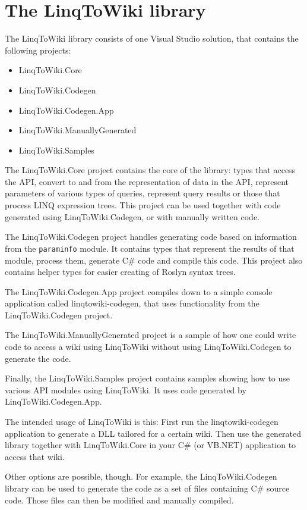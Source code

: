 \chapter{The LinqToWiki library}

The LinqToWiki library consists of one Visual Studio solution, that contains the following projects:

\begin{itemize}
\item LinqToWiki.Core
\item LinqToWiki.Codegen
\item LinqToWiki.Codegen.App
\item LinqToWiki.ManuallyGenerated
\item LinqToWiki.Samples
\end{itemize}

The LinqToWiki.Core project contains the core of the library:
types that access the \ac{API}, convert to and from the representation of data in the \ac{API},
represent parameters of various types of queries, represent query results
or those that process \ac{LINQ} expression trees.
This project can be used together with code generated using LinqToWiki.Codegen,
or with manually written code.

The LinqToWiki.Codegen project handles generating code based on information from the \texttt{paraminfo} module.
It contains types that represent the results of that module, process them, generate C\# code and compile this code.
This project also contains helper types for easier creating of Roslyn syntax trees.

The LinqToWiki.Codegen.App project compiles down to a simple console application called linqtowiki-codegen,
that uses functionality from the LinqToWiki.\allowbreak{}Codegen project.

The LinqToWiki.ManuallyGenerated project is a sample of how one could write code to access a wiki using LinqToWiki without using LinqToWiki.Codegen to generate the code.

Finally, the LinqToWiki.Samples project contains samples showing how to use various API modules using LinqToWiki.
It uses code generated by LinqToWiki.\allowbreak{}Codegen.\allowbreak{}App.

\medskip

The intended usage of LinqToWiki is this:
First run the linqtowiki-codegen application to generate a \ac{DLL} tailored for a certain wiki.
Then use the generated library together with LinqToWiki.Core in your C\# (or \ac{VB.NET}) application to access that wiki.

Other options are possible, though.
For example, the LinqToWiki.Codegen library can be used to generate the code as a set of files containing C\# source code.
Those files can then be modified and manually compiled.








